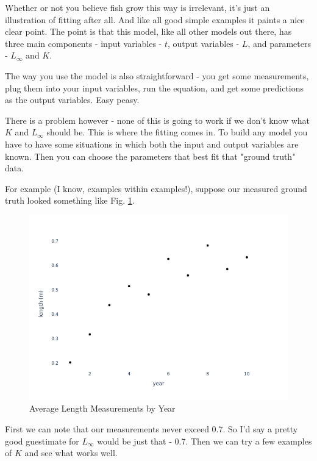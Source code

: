 \documentclass[11pt,a5paper]{book}
\begin{document}
Whether or not you believe fish grow this way is irrelevant, it's just an illustration of fitting after all. And like all good simple examples it paints a nice clear point. The point is that this model, like all other models out there, has three main components - input variables - $t$, output variables - $L$, and parameters - $L_{\infty}$ and $K$. 
\newline

The way you use the model is also straightforward - you get some measurements, plug them into your input variables, run the equation, and get some predictions as the output variables. Easy peasy. 
\newline

There is a problem however - none of this is going to work if we don't know what $K$ and $L_{\infty}$ should be. This is where the fitting comes in. To build any model you have to have some situations in which both the input and output variables are known. Then you can choose the parameters that best fit that "ground truth" data. 
\newline

For example (I know, examples within examples!), suppose our measured ground truth looked something like Fig. \ref{fig:length_measurements_by_year}.
\newline


\begin{figure}[h!] 
  \includegraphics[scale=0.35]{notebooks/Fitting/new_measurements.png}
  \caption{Average Length Measurements by Year}
  \label{fig:length_measurements_by_year}
\end{figure}

First we can note that our measurements never exceed 0.7. So I'd say a pretty good guestimate for $L_{\infty}$ would be just that - 0.7.  Then we can try a few examples of $K$ and see what works well.
\newline
\end{document}

